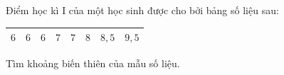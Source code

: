 \begin{ex}
Điểm học kì I của một học sinh được cho bởi bảng số liệu sau:
\begin{center}
\begin{tabular}{|c|c|c|c|c|c|c|c|}\hline
$6$ & $6$ & $6$ & $7$ & $7$ & $8$ & $8{,}5$ & $9{,}5$\\\hline
\end{tabular}
\end{center}
Tìm khoảng biến thiên của mẫu số liệu.
\end{ex}
